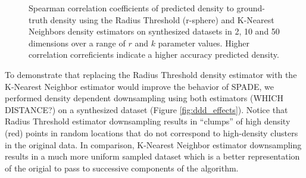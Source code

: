 \documentclass{article}
\begin{document}
\begin{figure}
\begin{center}

\caption{Spearman correlation coefficients of predicted density to ground-truth density using the Radius Threshold (r-sphere) and K-Nearest Neighbors density estimators on synthesized datasets in 2, 10 and 50 dimensions over a range of $r$ and $k$ parameter values. Higher correlation correficients indicate a higher accuracy predicted density. }
\label{fig:ddd_results}
\end{center}
\end{figure}

To demonstrate that replacing the Radius Threshold density estimator with the K-Nearest Neighbor estimator would improve the behavior of SPADE, we performed density dependent downsampling using both estimators (WHICH DISTANCE?) on a synthesized dataset (Figure \ref{fig:ddd_effects}).  Notice that  Radius Threshold estimator downsampling results in ``clumps'' of high density (red) points in random locations that do not correspond to high-density clusters in the original data.   In comparison, K-Nearest Neighbor estimator downsampling results in a much more uniform sampled dataset which is a better representation of the origial to pass to successive components of the algorithm. 
\end{document}
